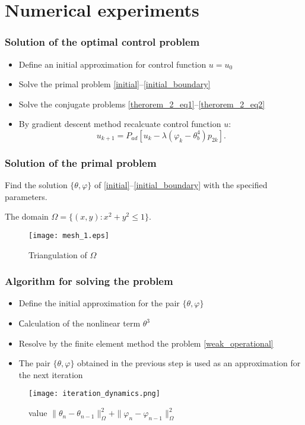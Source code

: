 \documentclass[9pt]{beamer}
\begin{document}
\section{Numerical experiments}
\begin{frame}
    \frametitle{Solution of the optimal control problem}
    \begin{itemize}
        \item Define an initial approximation for control function $u = u_0$
        \item Solve the primal problem \eqref{initial}--\eqref{initial_boundary}
        \item Solve the conjugate problems \eqref{therorem_2_eq1}--\eqref{therorem_2_eq2}
        \item By gradient descent method recalcuate control function $u$:
        $$u_{k+1} = P_{ad}\left[ u_k - \lambda (\varphi_k - \theta_b^4)p_{2k} \right].$$
    \end{itemize}
\end{frame}

\begin{frame}
\frametitle{Solution of the primal problem}
Find the solution $\{\theta, \varphi\}$ of \eqref{initial}--\eqref{initial_boundary} with the specified parameters.

The domain $\Omega = \{(x,y):x^2+y^2 \le 1\}$.
\begin{figure}[H]
    \centering
    \texttt{[image: mesh\_1.eps]}
    \caption{Triangulation of $\Omega$}
\end{figure}

\end{frame}
\begin{frame}
\frametitle{Algorithm for solving the problem}
    \begin{itemize}
        \item Define the initial approximation for the pair $\{\theta, \varphi\}$
        \item Сalculation of the nonlinear term $\theta^3$
        \item Resolve by the finite element method the problem \eqref{weak_operational}
        \item The pair $\{\theta, \varphi\}$  obtained in the previous step is used as an approximation for the next iteration
    \end{itemize}
    \begin{figure}[H]
        \centering
        \texttt{[image: iteration\_dynamics.png]}
        \caption{value $\|\theta_n - \theta_{n-1}\|_\Omega^2 + \|\varphi_n - \varphi_{n-1}\|_\Omega^2$}
    \end{figure}

\end{frame}
\end{document}

